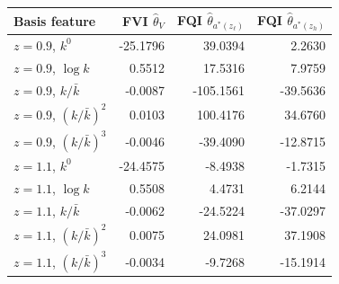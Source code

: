 \begin{tabular}{lrrr}
\hline
Basis feature & FVI $\hat{\theta}_V$ & FQI $\hat{\theta}_{a^*(z_\ell)}$ & FQI $\hat{\theta}_{a^*(z_h)}$ \\
\hline
$z = 0.9$, $k^0$ & -25.1796 & 39.0394 & 2.2630 \\
$z = 0.9$, $\log k$ & 0.5512 & 17.5316 & 7.9759 \\
$z = 0.9$, $k/\bar{k}$ & -0.0087 & -105.1561 & -39.5636 \\
$z = 0.9$, $(k/\bar{k})^2$ & 0.0103 & 100.4176 & 34.6760 \\
$z = 0.9$, $(k/\bar{k})^3$ & -0.0046 & -39.4090 & -12.8715 \\
\hline
$z = 1.1$, $k^0$ & -24.4575 & -8.4938 & -1.7315 \\
$z = 1.1$, $\log k$ & 0.5508 & 4.4731 & 6.2144 \\
$z = 1.1$, $k/\bar{k}$ & -0.0062 & -24.5224 & -37.0297 \\
$z = 1.1$, $(k/\bar{k})^2$ & 0.0075 & 24.0981 & 37.1908 \\
$z = 1.1$, $(k/\bar{k})^3$ & -0.0034 & -9.7268 & -15.1914 \\
\hline
\end{tabular}